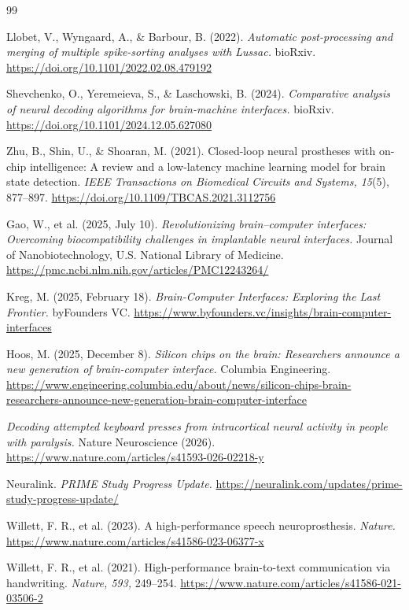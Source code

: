 \documentclass[11pt]{article}
\begin{document}
\begin{thebibliography}{99}

Llobet, V., Wyngaard, A., \& Barbour, B. (2022).
\emph{Automatic post-processing and merging of multiple spike-sorting analyses with Lussac.}
bioRxiv. \url{https://doi.org/10.1101/2022.02.08.479192}

Shevchenko, O., Yeremeieva, S., \& Laschowski, B. (2024).
\emph{Comparative analysis of neural decoding algorithms for brain-machine interfaces.}
bioRxiv. \url{https://doi.org/10.1101/2024.12.05.627080}

Zhu, B., Shin, U., \& Shoaran, M. (2021).
Closed-loop neural prostheses with on-chip intelligence: A review and a low-latency machine learning model for brain state detection.
\emph{IEEE Transactions on Biomedical Circuits and Systems, 15}(5), 877--897.
\url{https://doi.org/10.1109/TBCAS.2021.3112756}

Gao, W., et al. (2025, July 10).
\emph{Revolutionizing brain--computer interfaces: Overcoming biocompatibility challenges in implantable neural interfaces.}
Journal of Nanobiotechnology, U.S. National Library of Medicine.
\url{https://pmc.ncbi.nlm.nih.gov/articles/PMC12243264/}

Kreg, M. (2025, February 18).
\emph{Brain-Computer Interfaces: Exploring the Last Frontier.}
byFounders VC.
\url{https://www.byfounders.vc/insights/brain-computer-interfaces}

Hoos, M. (2025, December 8).
\emph{Silicon chips on the brain: Researchers announce a new generation of brain-computer interface.}
Columbia Engineering.
\url{https://www.engineering.columbia.edu/about/news/silicon-chips-brain-researchers-announce-new-generation-brain-computer-interface}

\emph{Decoding attempted keyboard presses from intracortical neural activity in people with paralysis.}
Nature Neuroscience (2026).
\url{https://www.nature.com/articles/s41593-026-02218-y}

Neuralink. \emph{PRIME Study Progress Update.}
\url{https://neuralink.com/updates/prime-study-progress-update/}

Willett, F. R., et al. (2023).
A high-performance speech neuroprosthesis. \emph{Nature.}
\url{https://www.nature.com/articles/s41586-023-06377-x}

Willett, F. R., et al. (2021).
High-performance brain-to-text communication via handwriting.
\emph{Nature, 593,} 249--254.
\url{https://www.nature.com/articles/s41586-021-03506-2}

\end{thebibliography}
\end{document}

